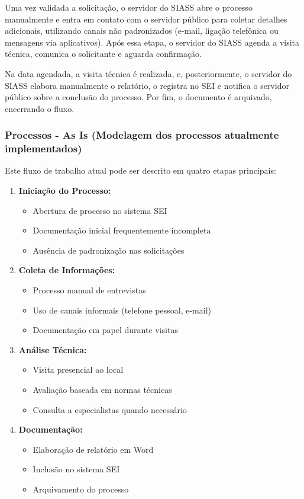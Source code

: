 \documentclass[12pt,a4paper]{article}
\begin{document}
Uma vez validada a solicitação, o servidor do SIASS abre o processo manualmente e entra em contato com o servidor público para coletar detalhes adicionais, utilizando canais não padronizados (e-mail, ligação telefônica ou mensagens via aplicativos). Após essa etapa, o servidor do SIASS agenda a visita técnica, comunica o solicitante e aguarda confirmação.

Na data agendada, a visita técnica é realizada, e, posteriormente, o servidor do SIASS elabora manualmente o relatório, o registra no SEI e notifica o servidor público sobre a conclusão do processo. Por fim, o documento é arquivado, encerrando o fluxo.

\subsubsection{Processos - As Is (Modelagem dos processos atualmente implementados)}

Este fluxo de trabalho atual pode ser descrito em quatro etapas principais:

\begin{enumerate}
    \item \textbf{Iniciação do Processo:}
    \begin{itemize}
        \item Abertura de processo no sistema SEI
        \item Documentação inicial frequentemente incompleta
        \item Ausência de padronização nas solicitações
    \end{itemize}
    
    \item \textbf{Coleta de Informações:}
    \begin{itemize}
        \item Processo manual de entrevistas
        \item Uso de canais informais (telefone pessoal, e-mail)
        \item Documentação em papel durante visitas
    \end{itemize}
    
    \item \textbf{Análise Técnica:}
    \begin{itemize}
        \item Visita presencial ao local
        \item Avaliação baseada em normas técnicas
        \item Consulta a especialistas quando necessário
    \end{itemize}
    
    \item \textbf{Documentação:}
    \begin{itemize}
        \item Elaboração de relatório em Word
        \item Inclusão no sistema SEI
        \item Arquivamento do processo
    \end{itemize}
\end{enumerate}
\end{document}
